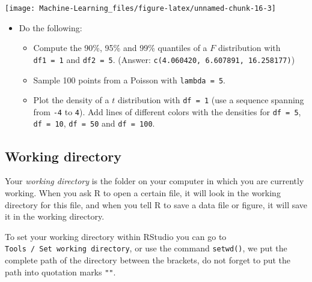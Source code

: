 \documentclass[]{book}
\newenvironment{Shaded}{\begin{snugshade}}{\end{snugshade}}
\newcommand{\KeywordTok}[1]{\textcolor[rgb]{0.13,0.29,0.53}{\textbf{#1}}}
\newcommand{\DataTypeTok}[1]{\textcolor[rgb]{0.13,0.29,0.53}{#1}}
\newcommand{\DecValTok}[1]{\textcolor[rgb]{0.00,0.00,0.81}{#1}}
\newcommand{\FloatTok}[1]{\textcolor[rgb]{0.00,0.00,0.81}{#1}}
\newcommand{\CommentTok}[1]{\textcolor[rgb]{0.56,0.35,0.01}{\textit{#1}}}
\newcommand{\NormalTok}[1]{#1}
\providecommand{\tightlist}{%
  \setlength{\itemsep}{0pt}\setlength{\parskip}{0pt}}
\newenvironment{rmdblock}[1]
  {\begin{shaded*}
  \begin{itemize}
  \renewcommand{\labelitemi}{
    \raisebox{-.7\height}[0pt][0pt]{
      {\setkeys{Gin}{width=2em,keepaspectratio}\texttt{[image: img/icons/\#1]}}
    }
  }
  \item
  }
  {
  \end{itemize}
  \end{shaded*}
  }
\newenvironment{rmdexercise}
  {\begin{rmdblock}{exercise}}
  {\end{rmdblock}}
\begin{document}
\begin{center}\texttt{[image: Machine-Learning\_files/figure-latex/unnamed-chunk-16-3]} \end{center}

\begin{Shaded}
\end{Shaded}

\begin{rmdexercise}
Do the following:

\begin{itemize}
\tightlist
\item
  Compute the 90\%, 95\% and 99\% quantiles of a \(F\) distribution with
  \texttt{df1\ =\ 1} and \texttt{df2\ =\ 5}. (Answer:
  \texttt{c(4.060420,\ 6.607891,\ 16.258177)})
\item
  Sample 100 points from a Poisson with \texttt{lambda\ =\ 5}.
\item
  Plot the density of a \(t\) distribution with \texttt{df\ =\ 1} (use a
  sequence spanning from \texttt{-4} to \texttt{4}). Add lines of
  different colors with the densities for \texttt{df\ =\ 5},
  \texttt{df\ =\ 10}, \texttt{df\ =\ 50} and \texttt{df\ =\ 100}.
\end{itemize}
\end{rmdexercise}

\subsection{Working directory}\label{working-directory}

Your \emph{working directory} is the folder on your computer in which
you are currently working. When you ask R to open a certain file, it
will look in the working directory for this file, and when you tell R to
save a data file or figure, it will save it in the working directory.

To set your working directory within RStudio you can go to
\texttt{Tools\ /\ Set\ working\ directory}, or use the command
\texttt{setwd()}, we put the complete path of the directory between the
brackets, do not forget to put the path into quotation marks
\texttt{""}.
\end{document}
